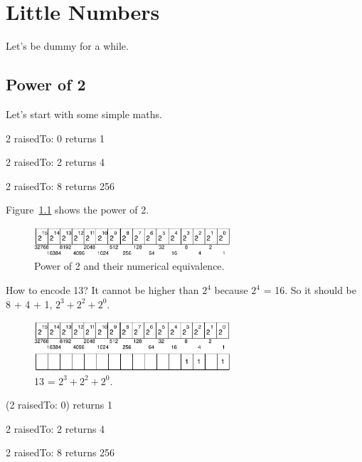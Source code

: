 \documentclass[a4paper,10pt,twoside]{book}
\begin{document}
\fi
\sloppy

\chapter{Little Numbers}




Let's be dummy for a while.

\section{Power of 2}

Let's start with some simple maths. 


\begin{code}{}
2 raisedTo: 0
	returns 1

2 raisedTo: 2
	returns 4
	
2 raisedTo: 8
	returns 256
\end{code}

Figure~\ref{power} shows the power of 2. 
\begin{figure}[h]
\begin{center}
\includegraphics[width=0.65\textwidth]{16bits-number}
\caption{Power of 2 and their numerical equivalence.\label{power}}
\end{center}
\end{figure}

How to encode 13? It cannot be higher than $2^{4}$ because $2^{4}$ = 16. So it should be 8 + 4 + 1, $2^{3} + 2^{2} + 2^{0}$.

\begin{figure}[h]
\begin{center}
\includegraphics[width=0.65\textwidth]{16bits-number13}
\caption{13 = $2^{3} + 2^{2} + 2^{0}$.}
\end{center}
\end{figure}


\begin{code}{}
(2 raisedTo: 0)
	returns 1

2 raisedTo: 2
	returns 4
	
2 raisedTo: 8
	returns 256
\end{code}
\end{document}
